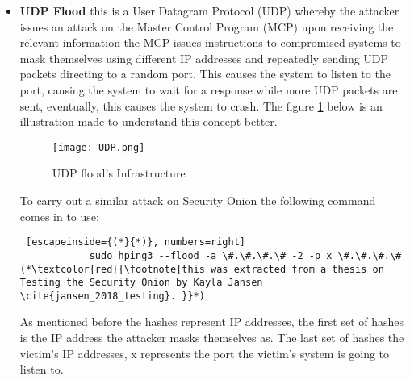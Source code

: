 \documentclass[12pt]{article}
\begin{document}
\begin{itemize}
		
		\begin{lstlisting} [escapeinside={(*}{*)}, numbers=right]
			hping3 ####.####.####.#### -q -n -d 90 -S -p xx --flood -rand-source (*\textcolor{red}{\footnote{this was extracted from a thesis on Testing the Security Onion by Kayla Jansen. \cite{jansen_2018_testing}}}*) \end{lstlisting} 
		
		
		
		To implement this command successfully the IP address of the victim must be swapped for the hashes, then -d 90 can be changed to the size of packets the attacker would like to send, and the x needs to be changed for the port number \cite{jansen_2018_testing}.
		
		
		\item \textbf{UDP Flood } \label{UDP}this is a User Datagram Protocol (UDP)  whereby the attacker issues an attack on the Master Control Program (MCP) upon receiving the relevant information the MCP issues instructions to compromised systems to mask themselves using different IP addresses and repeatedly sending UDP packets directing to a random port. This causes the system to listen to the port, causing the system to wait for a response while more UDP packets are sent, eventually, this causes the system to crash. The figure \ref{fig:UDP} below is an illustration made to understand this concept better.
		
		
		\begin{center}
			\begin{figure}[H]
				\centering
				\texttt{[image:  UDP.png]}
				\caption{UDP flood's Infrastructure \cite{singh_2010_agent}}
				\label{fig:UDP}
			\end{figure}
		\end{center}
		
		To carry out a similar attack on Security Onion the following command comes in to use:	\begin{lstlisting} [escapeinside={(*}{*)}, numbers=right]
			sudo hping3 --flood -a \#.\#.\#.\# -2 -p x \#.\#.\#.\# (*\textcolor{red}{\footnote{this was extracted from a thesis on Testing the Security Onion by Kayla Jansen \cite{jansen_2018_testing}. }}*) \end{lstlisting} 
		As mentioned before the hashes represent IP addresses, the first set of hashes is the IP address the attacker masks themselves as. The last set of hashes the victim's IP addresses, x represents the port the victim's system is going to listen to.
		

\end{itemize}
\end{document}
